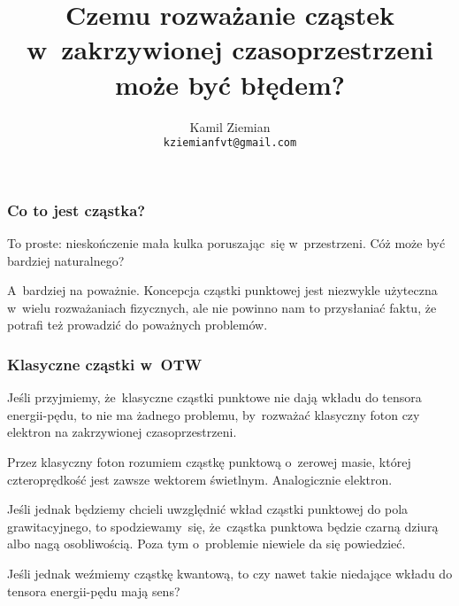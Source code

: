 \documentclass[10pt,t]{beamer}
\title{Czemu rozważanie cząstek w~zakrzywionej czasoprzestrzeni może być
  błędem?}
\author{Kamil Ziemian \\
  \texttt{kziemianfvt@gmail.com} }
\begin{document}






\RaggedRight





\maketitle













\begin{frame}
  \frametitle{Co to jest cząstka?}


  To proste: nieskończenie mała kulka poruszając~się w~przestrzeni.
  Cóż może być bardziej naturalnego?

  A~bardziej na poważnie. Koncepcja cząstki punktowej jest niezwykle
  użyteczna w~wielu rozważaniach fizycznych, ale nie powinno nam to
  przysłaniać faktu, że potrafi też prowadzić do poważnych problemów.

\end{frame}





\begin{frame}
  \frametitle{Klasyczne cząstki w~OTW}


  Jeśli przyjmiemy, że~klasyczne cząstki punktowe nie dają wkładu do
  tensora energii-pędu, to nie ma żadnego problemu, by~rozważać
  klasyczny foton czy elektron na zakrzywionej czasoprzestrzeni.

  Przez klasyczny foton rozumiem cząstkę punktową o~zerowej masie,
  której czteroprędkość jest zawsze wektorem świetlnym. Analogicznie
  elektron.

  Jeśli jednak będziemy chcieli uwzględnić wkład cząstki punktowej do
  pola grawitacyjnego, to spodziewamy~się, że~cząstka punktowa będzie
  czarną dziurą albo nagą osobliwością. Poza tym o~problemie niewiele
  da się powiedzieć.

  Jeśli jednak weźmiemy cząstkę kwantową, to czy nawet takie niedające
  wkładu do tensora energii-pędu mają sens?

\end{frame}
\end{document}

